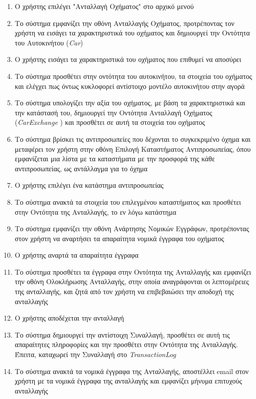 \documentclass{../ol-softwaremanual}
\begin{document}
	\begin{enumerate}
		\item Ο χρήστης επιλέγει \en"\gr Ανταλλαγή Οχήματος\en" \gr στο αρχικό μενού		
		\item Το σύστημα εμφανίζει την οθόνη Ανταλλαγής Οχήματος, προτρέποντας τον χρήστη να εισάγει τα χαρακτηριστικά του οχήματος και δημιουργεί την Οντότητα του Αυτοκινήτου (\en \textit{Car}\gr)
		\item Ο χρήστης εισάγει τα χαρακτηριστικά του οχήματος που επιθυμεί να αποσύρει
		\item Το σύστημα προσθέτει στην οντότητα του αυτοκινήτου, τα στοιχεία του οχήματος και ελέγχει πως όντως κυκλοφορεί αντίστοιχο μοντέλο αυτοκινήτου στην αγορά 
		\item Το σύστημα υπολογίζει την αξία του οχήματος, με βάση τα χαρακτηριστικά και την κατάστασή του, δημιουργεί την Οντότητα Ανταλλαγή Οχήματος (\en \textit{CarExchange} \gr) και προσθέτει σε αυτή τα στοιχεία του οχήματος
		\item Το σύστημα βρίσκει τις αντιπροσωπείες που δέχονται το συγκεκριμένο όχημα και μεταφέρει τον χρήστη στην οθόνη Επιλογή Καταστήματος Αντιπροσωπείας, όπου εμφανίζεται μια λίστα με τα καταστήματα με την προσφορά της κάθε αντιπροσωπείας, ως αντάλλαγμα για το όχημα
		\item Ο χρήστης επιλέγει ένα κατάστημα αντιπροσωπείας
		\item Το σύστημα ανακτά τα στοιχεία του επιλεγμένου καταστήματος και προσθέτει στην Οντότητα της Ανταλλαγής, το εν λόγω κατάστημα
		\item Το σύστημα εμφανίζει την οθόνη Ανάρτησης Νομικών Εγγράφων, προτρέποντας στον χρήστη να αναρτήσει τα απαραίτητα νομικά έγγραφα του οχήματος
		\item Ο χρήστης αναρτά τα απαραίτητα έγγραφα		
		\item Το σύστημα προσθέτει τα έγγραφα στην Οντότητα της Ανταλλαγής και εμφανίζει την οθόνη Ολοκλήρωσης Ανταλλαγής, στην οποία αναγράφονται οι λεπτομέρειες της ανταλλαγής, και ζητά από τον χρήστη να επιβεβαιώσει την αποδοχή της ανταλλαγής
		\item Ο χρήστης αποδέχεται την ανταλλαγή
		\item Το σύστημα δημιουργεί την αντίστοιχη Συναλλαγή, προσθέτει σε αυτή τις απαραίτητες πληροφορίες και την προσθέτει στην Οντότητα της Ανταλλαγής. Έπειτα, καταχωρεί την Συναλλαγή στο \en\textit{TransactionLog} \gr
		\item Το σύστημα ανακτά τα νομικά έγγραφα της Ανταλλαγής, αποστέλλει \en email \gr στον χρήστη με τα νομικά έγγραφα της ανταλλαγής και εμφανίζει μήνυμα επιτυχούς ανταλλαγής
	\end{enumerate}
	
\end{document}
